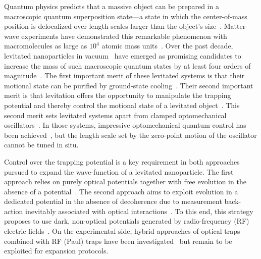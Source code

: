 Quantum physics predicts that a massive object can be prepared in a macroscopic quantum superposition state---a state in which the center-of-mass position is delocalized over length scales larger than the object's size~\cite{arndt2014testing}. Matter-wave experiments have demonstrated this remarkable phenomenon with macromolecules as large as $10^4$ atomic mass units~\cite{fein2019quantum}. Over the past decade, levitated nanoparticles in vacuum~\cite{millen2019optomechanics, gonzalez-ballestero2021levitodynamics} have emerged as promising candidates to increase the mass of such macroscopic quantum states by at least four orders of magnitude~\cite{romero-isart2011large, romero-isart2011quantum, scala2013matterwave, bateman2014nearfield, wan2016free, pino2018onchip, stickler2018probing, neumeier2022fast, roda-llordes2023macroscopic}. 
The first important merit of these levitated systems is that their motional state can be purified by ground-state cooling~\cite{delic2020cooling, magrini2021realtime, tebbenjohanns2021quantum, kamba2022optical, Ranfagni2022, piotrowski2023simultaneous}.
Their second important merit is that levitation offers the opportunity to  manipulate the trapping potential and thereby control the motional state of a levitated object~\cite{rashid2016experimental, hebestreit2018sensing, frimmer2019rapid, ciampini2021experimental}.
This second merit sets levitated systems apart from clamped optomechanical oscillators~\cite{aspelmeyer2014cavity}. In those systems, impressive optomechanical quantum control has been achieved~\cite{Rossi2018, oconnell2010quantum, lecocq2015quantum, riedinger2016nonclassical, moller2017quantum, chu2018creation, sletten2019resolving, bild2023schrodinger}, but the length scale set by the zero-point motion of the oscillator cannot be tuned in situ.

Control over the trapping potential is a key requirement in both approaches pursued to expand the wave-function of a levitated nanoparticle. The first approach relies on purely optical potentials together with free evolution in the absence of a potential~\cite{neumeier2022fast}. 
The second approach aims to exploit evolution in a dedicated potential in the absence of decoherence due to measurement back-action inevitably associated with optical interactions~\cite{jain2016direct, maurer2023quantum, dania2023ultrahigh}. 
To this end, this strategy proposes to use dark, non-optical potentials generated by radio-frequency (RF) electric fields~\cite{roda-llordes2023macroscopic,pino2018onchip}.
On the experimental side, hybrid approaches of optical traps combined with RF (Paul) traps have been investigated~\cite{millen2015cavity, nagornykh2015cooling, fonseca2016nonlinear, delord2017diamonds, conangla2018motion, conangla2020extending, bykov2022hybrid} but remain to be exploited for expansion protocols. 

